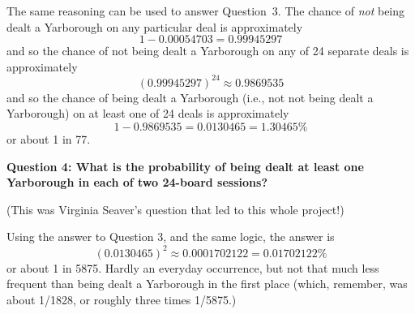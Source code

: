 The same reasoning can be used to answer Question~3.  The chance of 
\emph{not} being dealt a Yarborough on any particular deal is 
approximately
  $$1 - 0.00054703 = 0.99945297$$
and so the chance of not being dealt a Yarborough on any of 24 separate 
deals is approximately
  $$(0.99945297)^{24} \approx 0.9869535$$
and so the chance of being dealt a Yarborough (i.e., not not being dealt 
a Yarborough) on at least one of 24 deals is approximately
  $$1-0.9869535=0.0130465=1.30465\%$$
or about 1 in 77.

\pagebreak

\textbf{Question 4: What is the probability of being dealt at least one 
Yarborough in each of two 24-board sessions?}

(This was Virginia Seaver's question that led to this whole project!)

Using the answer to Question 3, and the same logic, the answer is 
  $$(0.0130465)^2\approx 0.0001702122=0.01702122\%$$
or about 1 in 5875.  Hardly an everyday occurrence, but not that much 
less frequent than being dealt a Yarborough in the first place (which, 
remember, was about 1/1828, or roughly three times 1/5875.)

\pagebreak

